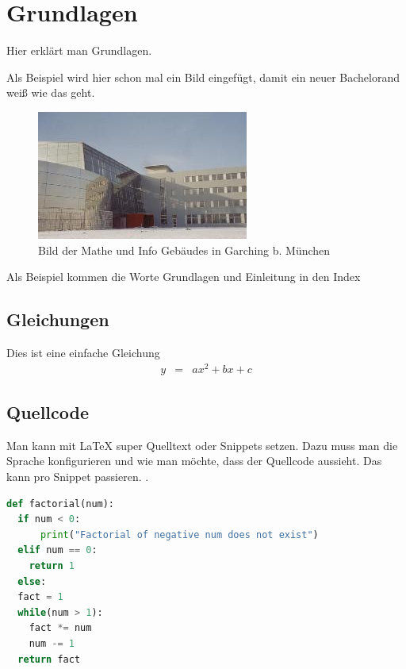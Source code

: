 \chapter{Grundlagen}
Hier erklärt man Grundlagen.

Als Beispiel wird hier schon mal ein Bild eingefügt, damit ein neuer Bachelorand wei\ss{} wie das geht.

\begin{figure}
	\centering
		\includegraphics{bilder/garching.jpg}
	\caption{Bild der Mathe und Info Gebäudes in Garching b. München}
	\label{fig:garching}
\end{figure}

Als Beispiel kommen die Worte Grundlagen und Einleitung in den Index  

%
\section{Gleichungen}\label{sec:gleichungen}
%
Dies ist eine einfache Gleichung
%
\begin{eqnarray}\label{gl:einfache_gleichung}
  y & = & ax^2 + bx + c
\end{eqnarray}



\section{Quellcode}
Man kann mit \LaTeX{} super Quelltext oder Snippets setzen. Dazu muss man die Sprache konfigurieren und wie man möchte, dass der Quellcode aussieht. Das kann pro Snippet passieren. . 
\lstset{
	numbers=left, numberstyle=\tiny, numbersep=5pt,
basicstyle=\small, %
}
\begin{lstlisting}[columns=fullflexible,showspaces=false,showtabs=false, language=Python, frame=single, caption={Fakultaetsberechnung}]
def factorial(num): 
  if num < 0: 
      print("Factorial of negative num does not exist")
  elif num == 0: 
    return 1
  else: 
  fact = 1
  while(num > 1): 
    fact *= num 
    num -= 1
  return fact 
\end{lstlisting}


